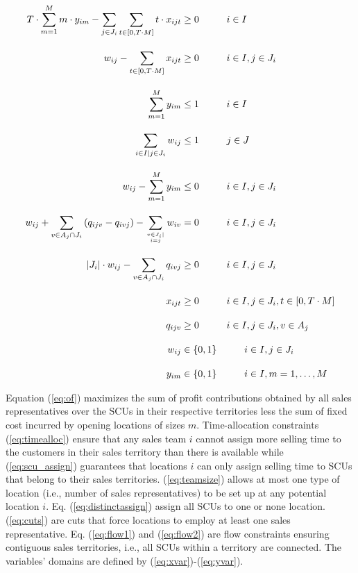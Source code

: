 \documentclass[12pt]{scrartcl}
\begin{document}
\begin{align}
     T \cdot \sum_{m=1}^{M}m \cdot y_{im} - \sum_{ j \in J_i} \sum_{t\in [0,T \cdot M]} t \cdot x_{ijt}  &\ge 0   \hspace*{1cm} i \in I \label{eq:timealloc} \\[1em] 
     w_{ij} - \sum_{t \in \left[0,T \cdot M \right]}x_{ijt} &\ge 0  \hspace*{1cm} i \in I, j \in J_i \label{eq:scu_assign} \\[1em]
     \sum_{m=1}^{M} y_{im} &\le 1 \hspace*{1cm} i \in I \label{eq:teamsize} \\[1em]
     \sum_{i \in I\mid j \in J_i} w_{ij}  & \le 1 \hspace*{1cm} j \in J \label{eq:distinctassign} \\[1em]
     w_{ij} - \sum_{m=1}^{M} y_{im} &\le 0     \hspace*{1cm} i \in I,  j \in J_i \label{eq:cuts} \\[1em]
     w_{ij} + \sum_{v \in A_j \cap J_i} \left(q_{ijv} - q_{ivj} \right) - \sum_{v \in J_i \mid \atop i=j} w_{iv} &= 0  \hspace*{1cm} i \in I,  j \in J_i \label{eq:flow1} \\[1em]
     \left|J_i\right|\cdot w_{ij} - \sum_{v \in A_j \cap J_i} q_{ivj} &\geq 0  \hspace*{1cm} i \in I, j \in J_i \label{eq:flow2} \\[1em]
     x_{ijt} &\geq 0 \hspace*{1cm} i \in I, j \in J_i, t \in \left[0,T\cdot M\right] \label{eq:xvar} \\[1em]
     q_{ijv} &\geq 0 \hspace*{1cm} i \in I, j \in J_i, v \in A_j \label{eq:qvar} \\[1em]
     w_{ij} &\in \{0,1\} \hspace*{1cm} i \in I, j \in J_i \label{eq:wvar} \\[1em]
     y_{im} &\in \{0,1\} \hspace*{1cm} i \in I, m=1,\dots,M \label{eq:yvar}
\end{align}

Equation (\ref{eq:of}) maximizes the sum of profit contributions obtained by all sales representatives over the SCUs in their respective territories less the sum of fixed cost incurred by opening locations of sizes $m$. Time-allocation constraints (\ref{eq:timealloc}) ensure that any sales team $i$ cannot assign more selling time to the customers in their sales territory than there is available while (\ref{eq:scu_assign}) guarantees that locations $i$ can only assign selling time to SCUs that belong to their sales territories. (\ref{eq:teamsize}) allows at most one type of location (i.e., number of sales representatives) to be set up at any potential location $i$. Eq. (\ref{eq:distinctassign}) assign all SCUs to one or none location. (\ref{eq:cuts}) are cuts that force locations to employ at least one sales representative. Eq. (\ref{eq:flow1}) and (\ref{eq:flow2}) are flow constraints ensuring contiguous sales territories, i.e., all SCUs within a territory are connected. The variables' domains are defined by (\ref{eq:xvar})-(\ref{eq:yvar}). \\
\end{document}
